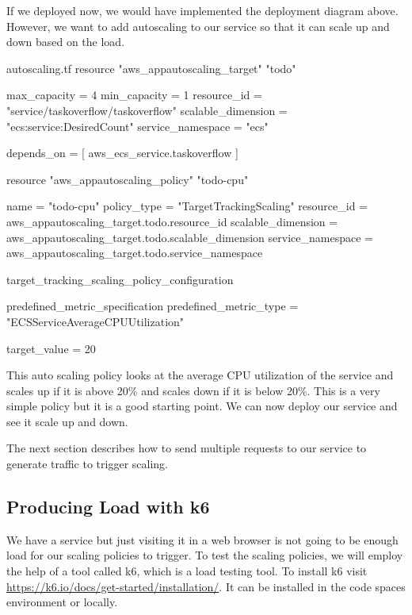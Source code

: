 \documentclass{csse4400}
\begin{document}
If we deployed now, we would have implemented the deployment diagram above.
However, we want to add autoscaling to our service so that it can scale up and down based on the load.

\begin{code}[language=terraform,numbers=none,keepspaces=true]{autoscaling.tf}
resource "aws_appautoscaling_target" "todo" {
  max_capacity        = 4
  min_capacity        = 1
  resource_id         = "service/taskoverflow/taskoverflow"
  scalable_dimension  = "ecs:service:DesiredCount"
  service_namespace   = "ecs"
  
  depends_on = [ aws_ecs_service.taskoverflow ]
}


resource "aws_appautoscaling_policy" "todo-cpu" {
  name                = "todo-cpu"
  policy_type         = "TargetTrackingScaling"
  resource_id         = aws_appautoscaling_target.todo.resource_id
  scalable_dimension  = aws_appautoscaling_target.todo.scalable_dimension
  service_namespace   = aws_appautoscaling_target.todo.service_namespace

  target_tracking_scaling_policy_configuration {
    predefined_metric_specification {
      predefined_metric_type  = "ECSServiceAverageCPUUtilization"
    }

    target_value              = 20
  }
}
\end{code}

This auto scaling policy looks at the average CPU utilization of the service and scales up if it is above 20\% and scales down if it is below 20\%.
This is a very simple policy but it is a good starting point.
We can now deploy our service and see it scale up and down.


The next section describes how to send multiple requests to our service to generate traffic to trigger scaling.

\subsection{Producing Load with k6}\label{k6}

We have a service but just visiting it in a web browser is not going to be enough load for our scaling policies to trigger.
To test the scaling policies, we will employ the help of a tool called k6, which is a load testing tool.
To install k6 visit \url{https://k6.io/docs/get-started/installation/}.
It can be installed in the code spaces environment or locally.
\end{document}
